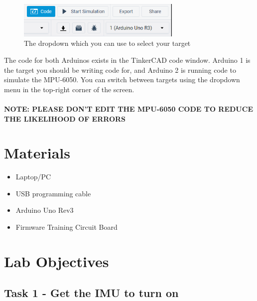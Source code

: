 \documentclass{article}
\begin{document}
        \begin{figure}[ht]
            \centering
            \includegraphics[width = 0.7\textwidth]{img/TinkerCadCode.PNG}
            \caption{The dropdown which you can use to select your target}
        \end{figure}
        
        The code for both Arduinos exists in the TinkerCAD code window. Arduino 1 is the target you should be writing code for, and Arduino 2 is running code to simulate the MPU-6050. You can switch between targets using the dropdown menu in the top-right corner of the screen. 
        \\ \\
        \textbf{NOTE: PLEASE DON'T EDIT THE MPU-6050 CODE TO REDUCE THE LIKELIHOOD OF ERRORS}
        
\section{Materials}
\begin{itemize}
    \item Laptop/PC
    \item USB programming cable
    \item Arduino Uno Rev3
    \item Firmware Training Circuit Board

\end{itemize}

\section{Lab Objectives}
    \subsection{Task 1 - Get the IMU to turn on}
\end{document}
